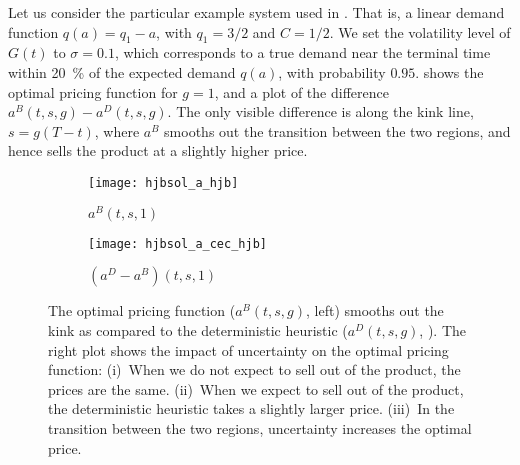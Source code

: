 \documentclass[main.tex]{subfiles}
\begin{document}
\begin{example}\label{ex:function_impact_uncertainty}
  Let us consider the particular example system used in
  . %
  That is, a linear demand function $q(a)=q_1-a$, with $q_1=3/2$
  and $C=1/2$.
  We set the volatility level of $G(t)$ to $\sigma=0.1$, which
  corresponds to a true demand near the terminal time within \SI{20}{\percent} of the
  expected demand $q(a)$, with probability $0.95$.
   shows the
  optimal pricing function for $g=1$, and a plot of the difference
  $a^B(t,s,g)-a^D(t,s,g)$. The only visible difference is along the kink
  line, $s=g(T-t)$, where $a^B$ smooths out the transition between
  the two regions, and hence sells the product at a slightly higher
  price.
  \begin{figure}[p]
    \centering
    \begin{subfigure}[b]{0.5\textwidth}
      \texttt{[image: hjbsol\_a\_hjb]}
      \caption{$a^B(t,s,1)$}
    \end{subfigure}%
    \begin{subfigure}[b]{0.5\textwidth}
      \texttt{[image: hjbsol\_a\_cec\_hjb]}
      \caption{$(a^D-a^B)(t,s,1)$}
    \end{subfigure}%
    \caption[Comparison of the optimal pricing function to the
    deterministic-case function]{The optimal pricing function ($a^B(t,s,g)$, left) smooths out the
      kink as compared to the deterministic heuristic ($a^D(t,s,g)$,
      ).
      The right plot shows the impact of uncertainty on the optimal
      pricing function: (i)~When we do not expect to sell out of the
      product, the prices are the same. (ii)~When we expect to sell out
      of the product, the deterministic heuristic takes a slightly larger
      price.
      (iii)~In the transition between the two regions, uncertainty
      increases the optimal price.
    }\label{fig:hjbsol_a}
  \end{figure}
\end{example}
\end{document}
